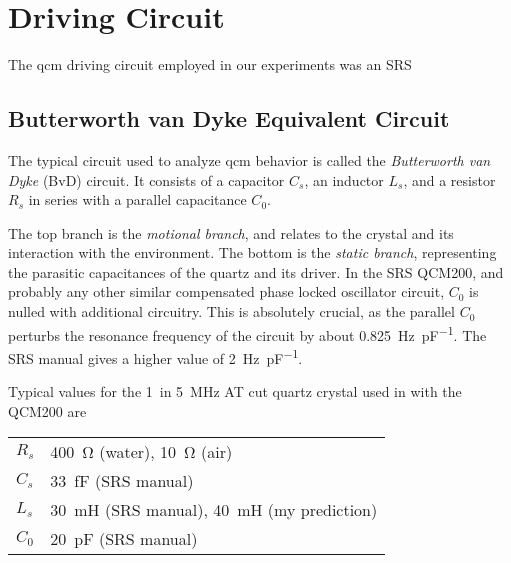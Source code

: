 \section{Driving Circuit}
The \gls{qcm} driving circuit employed in our experiments was an SRS
\subsection{Butterworth van Dyke Equivalent Circuit}
The typical circuit used to analyze \gls{qcm} behavior is called the
\textit{Butterworth van Dyke} (BvD) circuit.  It consists of a capacitor
$C_s$, an inductor $L_s$, and a resistor $R_s$ in series with a parallel
capacitance $C_0$.
\begin{center}
\end{center}

The top branch is the \textit{motional branch}, and relates to the crystal
and its interaction with the environment.  The bottom is the \textit{static
  branch}, representing the parasitic capacitances of the quartz and its driver.
In the SRS QCM200\cite{srsqcmmanual}, and probably any other similar
compensated phase locked oscillator circuit, $C_0$ is nulled with
additional circuitry.  This is absolutely crucial, as the parallel $C_0$
perturbs the resonance frequency of the circuit by about
\SI{0.825}{\hertz\per\pico\farad}.  The SRS manual gives a higher value
of \SI{2}{\hertz\per\pico\farad}.

Typical values for the \SI{1}{in} \SI{5}{\mega\hertz} AT cut quartz
crystal used in with the QCM200\cite{srsqcmmanual} are

\begin{table}[h]
  \begin{tabular}{ll}
    $R_s$ & \SI{400}{\ohm} (water), \SI{10}{\ohm} (air)                               \\
    $C_s$ & \SI{33}{\femto\farad} (SRS manual)                                        \\
    $L_s$ & \SI{30}{\milli\henry} (SRS manual), \SI{40}{\milli\henry} (my prediction) \\
    $C_0$ & \SI{20}{\pico\farad} (SRS manual)
  \end{tabular}
\end{table}

